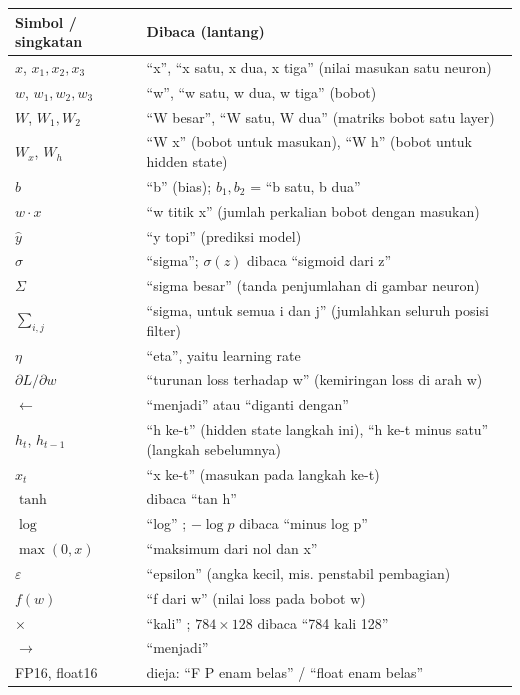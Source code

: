 \documentclass[11pt]{article}
\begin{document}
\renewcommand{\arraystretch}{1.3}
\begin{longtable}{@{}p{} p{}@{}}
\hline
\textbf{Simbol / singkatan} & \textbf{Dibaca (lantang)} \\ \hline
\endhead
$x$, $x_1, x_2, x_3$ & ``x'', ``x satu, x dua, x tiga'' (nilai masukan satu neuron) \\
$w$, $w_1, w_2, w_3$ & ``w'', ``w satu, w dua, w tiga'' (bobot) \\
$W$, $W_1, W_2$ & ``W besar'', ``W satu, W dua'' (matriks bobot satu layer) \\
$W_x$, $W_h$ & ``W x'' (bobot untuk masukan), ``W h'' (bobot untuk hidden state) \\
$b$ & ``b'' (bias); $b_1, b_2$ = ``b satu, b dua'' \\
$w \cdot x$ & ``w titik x'' (jumlah perkalian bobot dengan masukan) \\
$\hat{y}$ & ``y topi'' (prediksi model) \\
$\sigma$ & ``sigma''; $\sigma(z)$ dibaca ``sigmoid dari z'' \\
$\Sigma$ & ``sigma besar'' (tanda penjumlahan di gambar neuron) \\
$\sum_{i,j}$ & ``sigma, untuk semua i dan j'' (jumlahkan seluruh posisi filter) \\
$\eta$ & ``eta'', yaitu learning rate \\
$\partial L/\partial w$ & ``turunan loss terhadap w'' (kemiringan loss di arah w) \\
$\leftarrow$ & ``menjadi'' atau ``diganti dengan'' \\
$h_t$, $h_{t-1}$ & ``h ke-t'' (hidden state langkah ini), ``h ke-t minus satu'' (langkah sebelumnya) \\
$x_t$ & ``x ke-t'' (masukan pada langkah ke-t) \\
$\tanh$ & dibaca ``tan h'' \\
$\log$ & ``log'' ; $-\log p$ dibaca ``minus log p'' \\
$\max(0, x)$ & ``maksimum dari nol dan x'' \\
$\varepsilon$ & ``epsilon'' (angka kecil, mis. penstabil pembagian) \\
$f(w)$ & ``f dari w'' (nilai loss pada bobot w) \\
$\times$ & ``kali'' ; $784\times128$ dibaca ``784 kali 128'' \\
$\rightarrow$ & ``menjadi'' \\
FP16, float16 & dieja: ``F P enam belas'' / ``float enam belas'' \\

\end{longtable}
\end{document}
